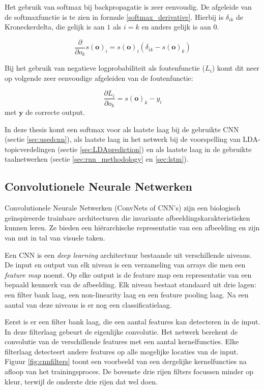 Het gebruik van softmax bij backpropagatie is zeer eenvoudig. De afgeleide van de softmaxfunctie is te zien in formule \eqref{softmax_derivative}. Hierbij is $\delta_{ik}$ de Kroneckerdelta, die gelijk is aan $1$ als $i = k$ en anders gelijk is aan $0$.

\begin{equation}
    \frac{\partial}{\partial o_k}s(\textbf{o})_i =  s(\textbf{o})_i(\delta_{ik} - s(\textbf{o})_k)
    \label{softmax_derivative}
\end{equation}

Bij het gebruik van negatieve logprobabiliteit als foutenfunctie ($L_i$) komt dit neer op volgende zeer eenvoudige afgeleiden van de foutenfunctie:

\begin{equation}
    \frac{\partial L_i}{\partial o_k} = s(\textbf{o})_k - y_i
\end{equation}
met $\textbf{y}$ de correcte output\cite{Bishop:1995:NNP:525960}.

In deze thesis komt een softmax voor als laatste laag bij de gebruikte CNN (sectie \ref{sec:usedcnn}), als laatste laag in het netwerk bij de voorspelling van LDA-topicverdelingen (sectie \ref{sec:LDAprediction}) en als laatste laag in de gebruikte taalnetwerken (sectie \ref{sec:rnn_methodology} en \ref{sec:lstm}).

\subsection{Convolutionele Neurale Netwerken}
\label{sec:CNN}
Convolutionele Neurale Netwerken (ConvNets of CNN's) zijn een biologisch ge\" inspireerde trainbare architecturen die invariante afbeeldingskarakteristieken kunnen leren.\cite{LeCun2010} Ze bieden een hi\"erarchische representatie van een afbeelding en zijn van nut in tal van visuele taken.\cite{Girshick2014}\cite{Ciresan2012}\cite{Zhou2015}

Een CNN is een \emph{deep learning} architectuur bestaande uit verschillende niveaus. De input en output van elk niveau is een verzameling van arrays die men een \emph{feature map} noemt. Op elke output is de feature map een representatie van een bepaald kenmerk van de afbeelding. Elk niveau bestaat standaard uit drie lagen: een filter bank laag, een non-linearity laag en een feature pooling laag. Na een aantal van deze niveaus is er nog een classificatielaag.

Eerst is er een filter bank laag, die een aantal features kan detecteren in de input. In deze filterlaag gebeurt de eigenlijke convolutie. Het netwerk berekent de convolutie van de verschillende features met een aantal kernelfuncties. Elke filterlaag detecteert andere features op alle mogelijke locaties van de input. Figuur \ref{fig:cnnfilters} toont een voorbeeld van een dergelijke kernelfuncties na afloop van het trainingsproces. De bovenste drie rijen filters focussen minder op kleur, terwijl de onderste drie rijen dat wel doen.

